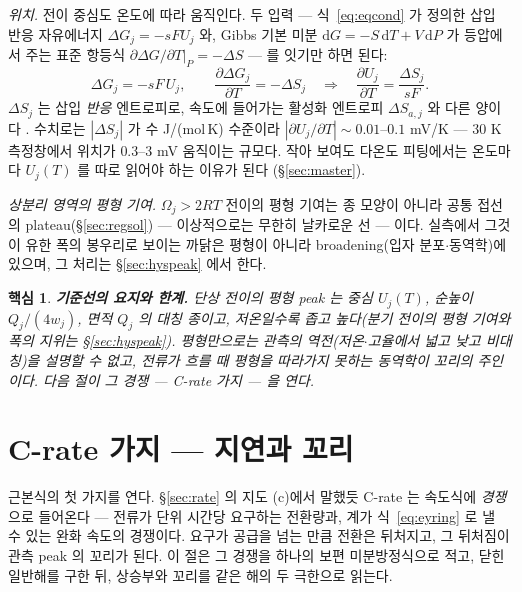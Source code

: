 \documentclass[11pt,a4paper]{article}
\newtheorem*{keybox}{핵심}
\newcommand{\dd}{\mathrm{d}}
\begin{document}
\emph{위치.} 전이 중심도 온도에 따라 움직인다. 두 입력 — 식~\eqref{eq:eqcond} 가 정의한 삽입
반응 자유에너지 $\Delta G_j=-sFU_j$ 와, Gibbs 기본 미분 $\dd G=-S\,\dd T+V\,\dd P$ 가 등압에서
주는 표준 항등식 $\partial\Delta G/\partial T|_P=-\Delta S$ — 를 잇기만 하면 된다:
\begin{equation}
\Delta G_j=-sF\,U_j,\qquad
\frac{\partial\Delta G_j}{\partial T}=-\Delta S_j
\quad\Longrightarrow\quad
\frac{\partial U_j}{\partial T}=\frac{\Delta S_j}{sF}.
\label{eq:dUdT}
\end{equation}
$\Delta S_j$ 는 삽입 \emph{반응} 엔트로피로, 속도에 들어가는 활성화 엔트로피 $\Delta S_{a,j}$ 와 다른
양이다 \cite{reynier2004}. 수치로는 $|\Delta S_j|$ 가 수 J/(mol\,K) 수준이라
$|\partial U_j/\partial T|\sim0.01$--$0.1$ mV/K — $30$ K 측정창에서 위치가 $0.3$--$3$ mV 움직이는
규모다. 작아 보여도 다온도 피팅에서는 온도마다 $U_j(T)$ 를 따로 읽어야 하는 이유가 된다
(\S\ref{sec:master}).

\emph{상분리 영역의 평형 기여.} $\Omega_j>2RT$ 전이의 평형 기여는 종 모양이 아니라
공통 접선의 plateau(\S\ref{sec:regsol}) — 이상적으로는 무한히 날카로운 선 — 이다. 실측에서 그것이 유한
폭의 봉우리로 보이는 까닭은 평형이 아니라 broadening(입자 분포$\cdot$동역학)에 있으며, 그 처리는
\S\ref{sec:hyspeak} 에서 한다.

\begin{keybox}
\textbf{기준선의 요지와 한계.} 단상 전이의 평형 peak 는 중심 $U_j(T)$, 순높이 $Q_j/(4w_j)$, 면적
$Q_j$ 의 대칭 종이고, 저온일수록 좁고 높다(분기 전이의 평형 기여와 폭의 지위는 \S\ref{sec:hyspeak}). 평형만으로는 관측의 역전(저온$\cdot$고율에서 넓고 낮고 비대칭)을 설명할 수 없고, 전류가 흐를 때 평형을 따라가지 못하는 \emph{동역학}이 꼬리의 주인이다. 다음 절이 그 경쟁 —
C-rate 가지 — 을 연다.
\end{keybox}

\section{C-rate 가지 — 지연과 꼬리}\label{sec:lag}
근본식의 첫 가지를 연다. \S\ref{sec:rate} 의 지도 (c)에서 말했듯 C-rate 는 속도식에 \emph{경쟁}으로
들어온다 — 전류가 단위 시간당 요구하는 전환량과, 계가 식~\eqref{eq:eyring} 로 낼 수 있는 완화 속도의
경쟁이다. 요구가 공급을 넘는 만큼 전환은 뒤처지고, 그 뒤처짐이 관측 peak 의 꼬리가 된다. 이 절은 그 경쟁을
하나의 보편 미분방정식으로 적고, 닫힌 일반해를 구한 뒤, 상승부와 꼬리를 같은 해의 두 극한으로 읽는다.
\end{document}
